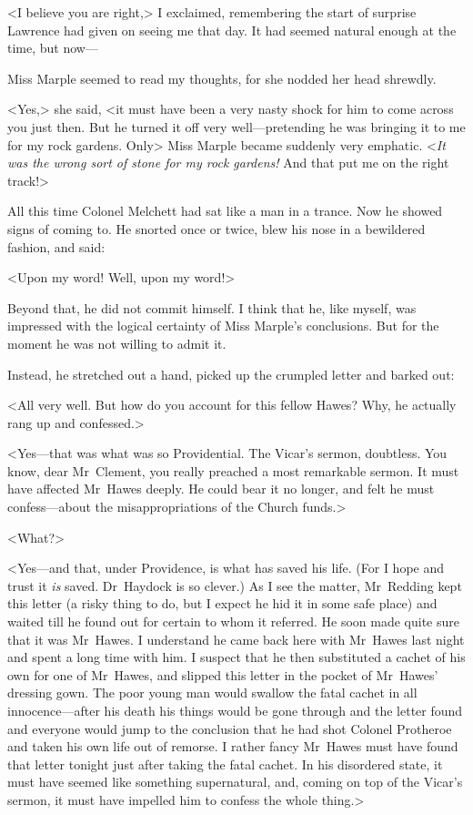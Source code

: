 <I believe you are right,> I exclaimed, remembering the start of surprise Lawrence had given on seeing me that day. It had seemed natural enough at the time, but now—

Miss Marple seemed to read my thoughts, for she nodded her head shrewdly.

<Yes,> she said, <it must have been a very nasty shock for him to come across you just then. But he turned it off very well—pretending he was bringing it to me for my rock gardens. Only\longdash> Miss Marple became suddenly very emphatic. <\emph{It was the wrong sort of stone for my rock gardens!} And that put me on the right track!>

All this time Colonel Melchett had sat like a man in a trance. Now he showed signs of coming to. He snorted once or twice, blew his nose in a bewildered fashion, and said:

<Upon my word! Well, upon my word!>

Beyond that, he did not commit himself. I think that he, like myself, was impressed with the logical certainty of Miss Marple's conclusions. But for the moment he was not willing to admit it.

Instead, he stretched out a hand, picked up the crumpled letter and barked out:

<All very well. But how do you account for this fellow Hawes? Why, he actually rang up and confessed.>

<Yes—that was what was so Providential. The Vicar's sermon, doubtless. You know, dear Mr~Clement, you really preached a most remarkable sermon. It must have affected Mr~Hawes deeply. He could bear it no longer, and felt he must confess—about the misappropriations of the Church funds.>

<What?>

<Yes—and that, under Providence, is what has saved his life. (For I hope and trust it \emph{is} saved. Dr~Haydock is so clever.) As I see the matter, Mr~Redding kept this letter (a risky thing to do, but I expect he hid it in some safe place) and waited till he found out for certain to whom it referred. He soon made quite sure that it was Mr~Hawes. I understand he came back here with Mr~Hawes last night and spent a long time with him. I suspect that he then substituted a cachet of his own for one of Mr~Hawes, and slipped this letter in the pocket of Mr~Hawes' dressing gown. The poor young man would swallow the fatal cachet in all innocence—after his death his things would be gone through and the letter found and everyone would jump to the conclusion that he had shot Colonel Protheroe and taken his own life out of remorse. I rather fancy Mr~Hawes must have found that letter tonight just after taking the fatal cachet. In his disordered state, it must have seemed like something supernatural, and, coming on top of the Vicar's sermon, it must have impelled him to confess the whole thing.>

